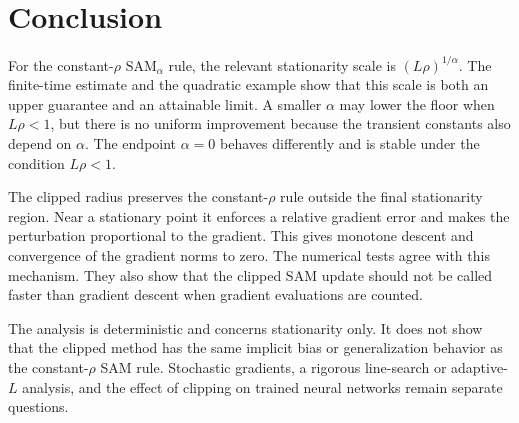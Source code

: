 \documentclass[11pt]{article}
\theoremstyle{remark}
\newcommand{\SAMa}{\mathrm{SAM}_{\alpha}}
\begin{document}
\clearpage
\section{Conclusion}\label{sec6}

For the constant-$\rho$ $\SAMa$ rule, the relevant stationarity scale is
$(L\rho)^{1/\alpha}$.  The finite-time estimate and the quadratic example
show that this scale is both an upper guarantee and an attainable limit.
A smaller $\alpha$ may lower the floor when $L\rho<1$, but there is no
uniform improvement because the transient constants also depend on
$\alpha$.  The endpoint $\alpha=0$ behaves differently and is stable
under the condition $L\rho<1$.

The clipped radius preserves the constant-$\rho$ rule outside the final
stationarity region.  Near a stationary point it enforces a relative
gradient error and makes the perturbation proportional to the gradient.  This
gives monotone descent and convergence of the gradient norms to zero.  The
numerical tests agree with this mechanism.  They also show that the clipped
SAM update should not be called faster than gradient descent when gradient
evaluations are counted.

The analysis is deterministic and concerns stationarity only.  It does not
show that the clipped method has the same implicit bias or generalization
behavior as the constant-$\rho$ SAM rule.  Stochastic gradients, a rigorous
line-search or adaptive-$L$ analysis, and the effect of clipping on trained
neural networks remain separate questions.
\end{document}
